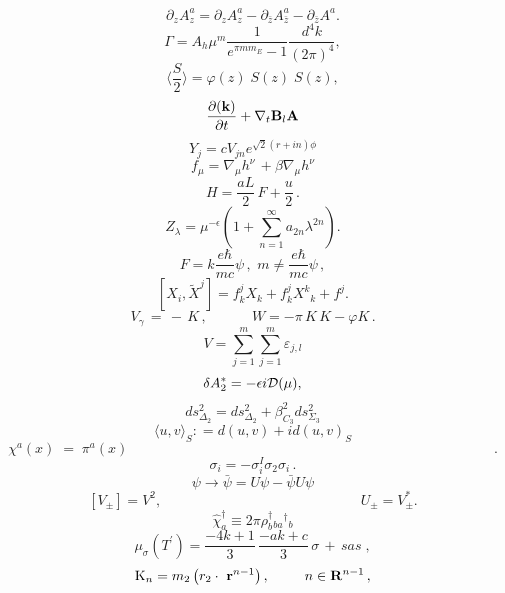 \documentclass{article}
\begin{document}
$$\partial _ { z } A _ { z } ^ { a } = \partial _ { z } A _ { z } ^ { a } - \partial _ { \bar { z } } A _ { \bar { z } } ^ { a } - \partial _ { \bar { z } } A ^ { a } .$$
$$\Gamma = A _ { h } \mu ^ { m } \frac { 1 } { e ^ { \pi m m _ { E } } - 1 } \frac { d ^ { 4 } k } { ( 2 \pi ) ^ { 4 } } ,$$
$$\langle { \frac { S } { { 2 } } } \rangle = \varphi ( z ) \; S ( z ) \; S ( z ) ,$$
$$\frac { \partial ( { \bf k } ) } { \partial t } + \nabla _ { t } { \bf B } _ { l } { \bf { \bf A } }$$
$$Y _ { j } = c V _ { j n } e ^ { \sqrt { 2 } ( r + i n ) \phi }$$
$$f _ { \mu } = \nabla _ { \mu } h ^ { \nu } \, + \beta \nabla _ { \mu } h ^ { \nu }$$
$$H = \frac { a L } { 2 } \, F + \frac { u } { 2 } \, .$$
$$Z _ { \lambda } = \mu ^ { - \epsilon } ( 1 + \sum _ { n = 1 } ^ { \infty } a _ { 2 n } \lambda ^ { 2 n } ) .$$
$$F = k \frac { e \hbar } { m c } \psi \, , \, \, m \neq \frac { e \hbar } { m c } \psi \, ,$$
$$[ X _ { i } , \tilde { X } ^ { j } ] = f _ { k } ^ { j } X _ { k } + f _ { k } ^ { j } X ^ { k } { } _ { k } + f ^ { j } .$$
$$V _ { \gamma } \, = \, - \, K \, , \, \, \, \, \, \, \, \, \, \, \, \, \, \, \, \, \, \, \, W = - \pi \, K \, K - \varphi K \, .$$
$$V = \sum _ { j = 1 } ^ { m } \sum _ { j = 1 } ^ { m } \varepsilon _ { j , l }$$
$$\delta A _ { 2 } ^ { * } = - \epsilon i { \cal D } ( \mu ) ,$$
$$d s _ { \Delta _ { 2 } } ^ { 2 } = d s _ { \Delta _ { 2 } } ^ { 2 } + \beta _ { C _ { 3 } } ^ { 2 } d s _ { \Sigma _ { 3 } } ^ { 2 }$$
$$\langle u , v \rangle _ { S } : = d ( u , v ) + i d ( u , v ) _ { S }$$
$$\chi ^ { a } ( x ) \; = \; \pi ^ { a } ( x ) \; \; \; \; \; \; \; \; \; \; \; \; \; \; \; \; \; \; \; \; \; \; \; \; \; \; \; \; \; \; \; \; \; \; \; \; \; \; \; \; \; \; \; \; \; \; \; \; \; \; \; \; \; \; \; \; \; \; \; \; \; \; \; \; \; \; \; \; \; \; \; \; \; \; \; \; \; \; \; \; \; \; \; \; \; \; \; \; \; \; \; \; \; \; .$$
$$\sigma _ { i } = - \sigma _ { i } ^ { I } \sigma _ { 2 } \sigma _ { i } \, .$$
$$\psi \rightarrow \bar { \psi } = U \psi - \bar { \psi } U \psi$$
$$\left [ V _ { \pm } \right ] = V ^ { 2 } , \; \; \; \; \; \; \; \; \; \; \; \; \; \; \; \; \; \; \; \; \; \; \; \; \; \; \; \; \; \; \; \; \; \; \; \; \; \; \; \; \; \; \; \; \; \; \; \; \; \; \; U _ { \pm } = V _ { \pm } ^ { * } .$$
$$\hat { \chi } _ { a } ^ { \dagger } \equiv 2 \pi \rho _ { b } ^ { \dagger } { } _ { b a } { } ^ { \dagger } { } _ { b }$$
$$\mu _ { \sigma } ( T ^ { \prime } ) = \frac { - 4 k + 1 } { 3 } \, \frac { - a k + c } { 3 } \, \sigma \, + \, s a s \; ,$$
$$\mathrm { K } _ { n } = m _ { 2 } \left ( r _ { 2 } \cdot \mathrm { \bf ~ r } ^ { n - 1 } \right ) , \, \, \, \, \, \, \, \, \, \, \, \, \, \, \, n \in { \bf R } ^ { n - 1 } \, ,$$
\end{document}
